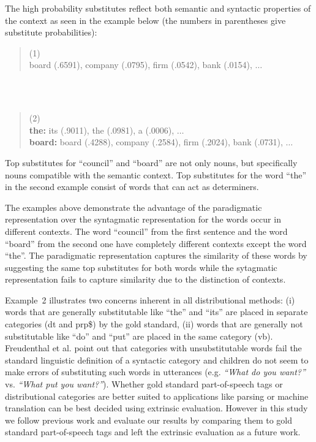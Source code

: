 The high probability substitutes reflect both semantic and syntactic
properties of the context as seen in the example below (the numbers in
parentheses give substitute probabilities):
\begin{quote}
  (1) \\
             board (.6591), company (.0795), firm (.0542), bank (.0154), $\ldots$
\end{quote}
\\\\
\begin{quote}
 (2) \\
 {\bf the:} its (.9011), the (.0981), a (.0006), $\ldots$\\
            {\bf board:} board (.4288), company (.2584), firm (.2024), bank (.0731), $\ldots$
\end{quote}

Top substitutes for ``council'' and ``board'' are not only nouns, but
specifically nouns compatible with the semantic context.  Top
substitutes for the word ``the'' in the second example consist of
words that can act as determiners.

The examples above demonstrate the advantage of the paradigmatic
representation over the syntagmatic representation for the words occur
in different contexts.  The word ``council'' from the first sentence
and the word ``board'' from the second one have completely different
contexts except the word ``the''.  The paradigmatic representation
captures the similarity of these words by suggesting the same top
substitutes for both words while the sytagmatic representation fails
to capture similarity due to the distinction of contexts.

Example~2 illustrates two concerns inherent in all distributional
methods: (i) words that are generally substitutable like ``the'' and
``its'' are placed in separate categories ({\sc dt} and {\sc prp\$})
by the gold standard, (ii) words that are generally not substitutable
like ``do'' and ``put'' are placed in the same category ({\sc vb}).
Freudenthal et al.  point out
that categories with unsubstitutable words fail the standard
linguistic definition of a syntactic category and children do not seem
to make errors of substituting such words in utterances
(e.g. {\em``What do you want?''}  vs. {\em *``What put you want?''}).
Whether gold standard part-of-speech tags or distributional categories
are better suited to applications like parsing or machine translation
can be best decided using extrinsic evaluation.  However in this study
we follow previous work and evaluate our results by comparing them to
gold standard part-of-speech tags and left the extrinsic evaluation as
a future work.

